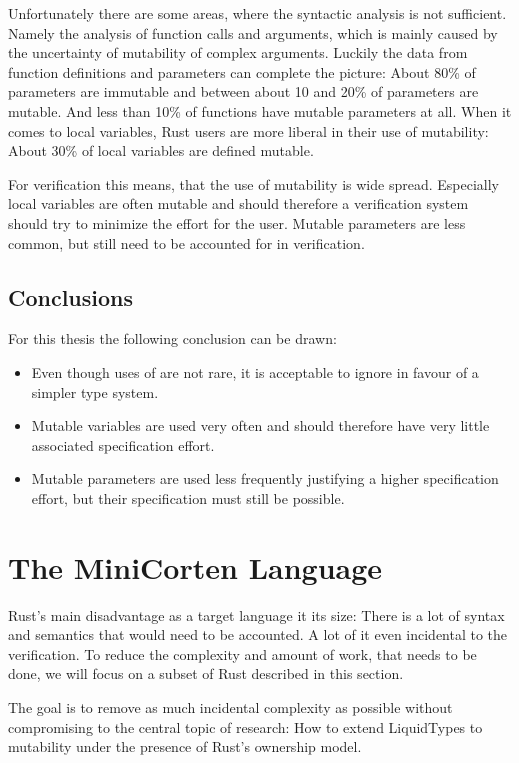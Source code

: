 \documentclass[twoside, english]{sdqthesis}
\theoremstyle{definition}
\begin{document}
Unfortunately there are some areas, where the syntactic analysis is not sufficient. Namely the analysis of function calls and arguments, which is mainly caused by the uncertainty of mutability of complex arguments.
Luckily the data from function definitions and parameters can complete the picture: About 80\% of parameters are immutable and between about 10 and 20\% of parameters are mutable. And less than 10\% of functions have mutable parameters at all.
When it comes to local variables, Rust users are more liberal in their use of mutability:
About 30\% of local variables are defined mutable.

For verification this means, that the use of mutability is wide spread. Especially local variables are often mutable and should therefore a verification system should try to minimize the effort for the user. Mutable parameters are less common, but still need to be accounted for in verification.

\section{Conclusions}

For this thesis the following conclusion can be drawn:

\begin{itemize}
  \item Even though uses of  are not rare, it is acceptable to ignore in favour of a simpler type system.
  \item Mutable variables are used very often and should therefore have very little associated specification effort.
  \item Mutable parameters are used less frequently justifying a higher specification effort, but their specification must still be possible.
\end{itemize}

\chapter{The MiniCorten Language} \label{ch:language} 

Rust's main disadvantage as a target language it its size: There is a lot of syntax and semantics that would need to be accounted. A lot of it even incidental to the verification. To reduce the complexity and amount of work, that needs to be done, we will focus on a subset of Rust described in this section.

The goal is to remove as much incidental complexity as possible without compromising to the central topic of research: How to extend LiquidTypes to mutability under the presence of Rust's ownership model.
\end{document}

